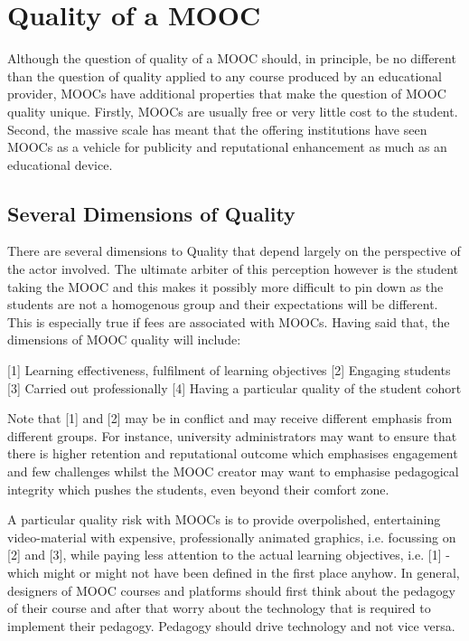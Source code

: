 \section{Quality of a MOOC}

Although the question of quality of a MOOC should, in principle, be no
different than the question of quality applied to any course produced by
an educational provider, MOOCs have additional properties that make the
question of MOOC quality unique. Firstly, MOOCs are usually free or very
little cost to the student. Second, the massive scale has meant that the
offering institutions have seen MOOCs as a vehicle for publicity and
reputational enhancement as much as an educational device.

\subsection{Several Dimensions of Quality}

There are several dimensions to Quality that depend largely on the
perspective of the actor involved. The ultimate arbiter of this
perception however is the student taking the MOOC and this makes it
possibly more difficult to pin down as the students are not a homogenous
group and their expectations will be different. This is especially true
if fees are associated with MOOCs.  Having said that, the dimensions of
MOOC quality will include:

[1] Learning effectiveness, fulfilment of learning objectives [2]
Engaging students [3] Carried out professionally [4] Having a particular
quality of the student cohort

Note that [1] and [2] may be in conflict and may receive different
emphasis from different groups. For instance, university administrators
may want to ensure that there is higher retention and reputational
outcome which emphasises engagement and few challenges whilst the MOOC
creator may want to emphasise pedagogical integrity which pushes the
students, even beyond their comfort zone.

A particular quality risk with MOOCs is to provide overpolished,
entertaining video-material with expensive, professionally animated
graphics, i.e. focussing on [2] and [3], while paying less attention to
the actual learning objectives, i.e. [1] - which might or might not have
been defined in the first place anyhow. In general, designers of MOOC
courses and platforms should first think about the pedagogy of their
course and after that worry about the technology that is required to
implement their pedagogy. Pedagogy should drive technology and not vice
versa.

